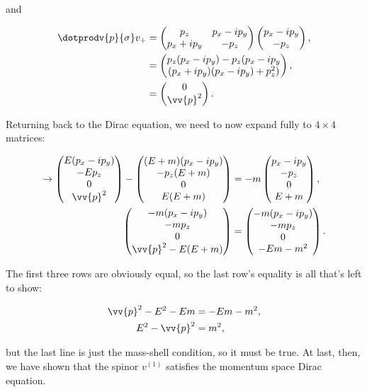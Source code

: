 and

\begin{align*}
    \dotprodv{p}{\sigma} v_+ &= \begin{pmatrix}p_z & p_x - ip_y \\ p_x + ip_y & -p_z\end{pmatrix}\veeplus, \\
    &=  \begin{pmatrix}
            p_z(p_x - ip_y) - p_z(p_x - ip_y \\ (p_x + ip_y)(p_x - ip_y) + p_z^2)
        \end{pmatrix}, \\
    &= \begin{pmatrix}0 \\ \vv{p}^2 \end{pmatrix}.
\end{align*}

Returning back to the Dirac equation, we need to now expand fully to $4\times4$ matrices:

\begin{align*}
    \rightarrow \begin{pmatrix}E(p_x - ip_y) \\ -Ep_z \\ 0 \\ \vv{p}^2\end{pmatrix} - \begin{pmatrix}(E+m)(p_x - ip_y) \\ -p_z(E+m) \\ 0 \\ E(E+m)\end{pmatrix} &= -m\begin{pmatrix}p_x - ip_y \\ -p_z \\ 0 \\ E+m \end{pmatrix}, \\
    \begin{pmatrix}-m(p_x - ip_y) \\ -mp_z \\ 0 \\ \vv{p}^2 - E(E+m)\end{pmatrix} &= \begin{pmatrix}-m(p_x - ip_y) \\ -mp_z \\ 0 \\ -Em - m^2\end{pmatrix}.
\end{align*}

The first three rows are obviously equal, so the last row's equality is all that's left to show:

\begin{align*}
    \vv{p}^2 - E^2 - Em &= -Em - m^2, \\
    E^2 - \vv{p}^2 &= m^2,
\end{align*}

but the last line is just the mass-shell condition, so it must be true. At last, then, we have shown that the spinor $v^{(1)}$ satisfies the momentum space Dirac equation.